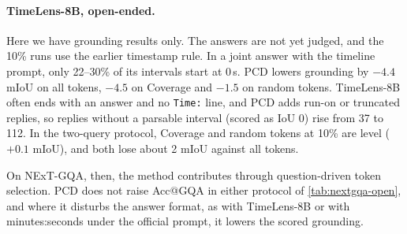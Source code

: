 \paragraph{TimeLens-8B, open-ended.}
Here we have grounding results only. The answers are not yet judged, and the 10\% runs use the earlier timestamp
rule. In a joint answer with the timeline prompt, only 22--30\% of its intervals start at 0\,s. PCD lowers grounding
by $-4.4$ mIoU on all tokens, $-4.5$ on Coverage and $-1.5$ on random tokens. TimeLens-8B often ends with an answer
and no \texttt{Time:} line, and PCD adds run-on or truncated replies, so replies without a parsable interval (scored
as IoU 0) rise from 37 to 112. In the two-query protocol, Coverage and random tokens at 10\% are level ($+0.1$
mIoU), and both lose about 2 mIoU against all tokens. 

On NExT-GQA, then, the method contributes through question-driven token selection. PCD does not raise Acc@GQA in
either protocol of \cref{tab:nextgqa-open}, and where it disturbs the answer format, as with TimeLens-8B or with
minutes:seconds under the official prompt, it lowers the scored grounding.

